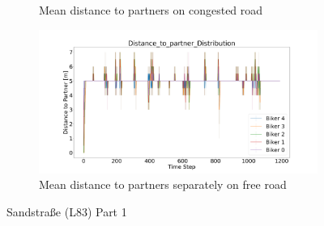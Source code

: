 \begin{figure}[H]
\begin{subfigure}[b]{0.45\textwidth}
		\caption{Mean distance to partners on congested road}
	\end{subfigure}
	\hfill
	\begin{subfigure}[b]{0.45\textwidth}
		\centering
		\includegraphics[width=1.0\textwidth]{images/Sandstrase/Sandstrase_Distance_to_partner_distribution_free.png}
		\caption{Mean distance to partners separately on free road}
	\end{subfigure}
	\caption{Sandstraße (L83) Part 1}
\end{figure}

